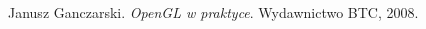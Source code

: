 \documentclass[12pt, a4paper, oneside]{Thesis} %
\begin{document}

\pagestyle{fancy}



\tableofcontents 



\mainmatter 

\pagestyle{fancy} 







\listoffigures %


\backmatter

\begin{thebibliography}{1}

Janusz Ganczarski. 
\emph{OpenGL w praktyce}. Wydawnictwo BTC, 2008.



\end{thebibliography}
\end{document}
